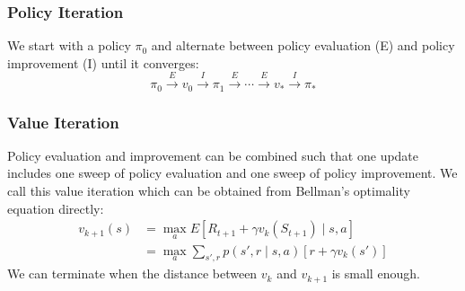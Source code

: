 \documentclass[twocolumn, 10pt]{article}
\begin{document}
\subsubsection*{Policy Iteration}
We start with a policy $\pi_0$ and alternate between policy evaluation (E) and policy improvement (I) until it converges:
$$ \pi_0 \overset{E}{\rightarrow} v_0 \overset{I}{\rightarrow} \pi_1 \overset{E}{\rightarrow} \cdots \overset{E}{\rightarrow} v_* \overset{I}{\rightarrow} \pi_* $$
 
 \subsubsection*{Value Iteration}
 Policy evaluation and improvement can  be combined such that one update includes one sweep of policy evaluation and one sweep of policy improvement. We call this value iteration which can be obtained from Bellman's optimality equation directly:
 $$
 \begin{aligned}
 v_{k+1}(s) &= \max_{a} E[R_{t+1} + \gamma v_{k}(S_{t+1}) \mid s, a] \\
                     &= \max_{a} \sum_{s' , r} p(s', r \mid s, a) [r + \gamma v_{k}(s')]
 \end{aligned}
 $$
 We can terminate when the distance between $v_k$ and $v_{k+1}$ is small enough.
\end{document}

